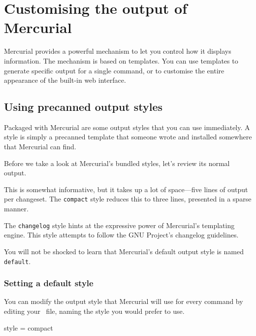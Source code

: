 \chapter{Customising the output of Mercurial}
\label{chap:template}

Mercurial provides a powerful mechanism to let you control how it
displays information.  The mechanism is based on templates.  You can
use templates to generate specific output for a single command, or to
customise the entire appearance of the built-in web interface.

\section{Using precanned output styles}
\label{sec:style}

Packaged with Mercurial are some output styles that you can use
immediately.  A style is simply a precanned template that someone
wrote and installed somewhere that Mercurial can find.

Before we take a look at Mercurial's bundled styles, let's review its
normal output.


This is somewhat informative, but it takes up a lot of space---five
lines of output per changeset.  The \texttt{compact} style reduces
this to three lines, presented in a sparse manner.


The \texttt{changelog} style hints at the expressive power of
Mercurial's templating engine.  This style attempts to follow the GNU
Project's changelog guidelines\cite{web:changelog}.


You will not be shocked to learn that Mercurial's default output style
is named \texttt{default}.

\subsection{Setting a default style}

You can modify the output style that Mercurial will use for every
command by editing your \hgrc\ file, naming the style you would
prefer to use.

\begin{codesample2}
  [ui]
  style = compact
\end{codesample2}

